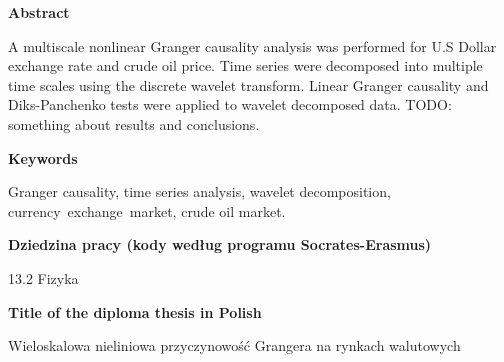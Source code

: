 \newpage
\begin{center}
\textbf{Abstract}
\end{center}

A multiscale nonlinear Granger causality analysis was performed for U.S Dollar exchange rate and crude oil price.
Time series were decomposed into multiple time scales using the discrete wavelet transform.
Linear Granger causality and Diks-Panchenko tests were applied to wavelet decomposed data.
TODO: something about results and conclusions.
\vspace{2.5cm}
\begin{center}

\textbf{Keywords}\vspace{0.3cm}

Granger causality, time series analysis, wavelet decomposition, \mbox{currency exchange market}, crude oil market.\\
\vspace{2.5cm}

\textbf{Dziedzina pracy (kody według programu Socrates-Erasmus)}\vspace{0.3cm}

13.2 Fizyka\\
\vspace{2.5cm}

\textbf{Title of the diploma thesis in Polish}\vspace{0.3cm}

Wieloskalowa nieliniowa przyczynowość Grangera na rynkach walutowych
\end{center}

